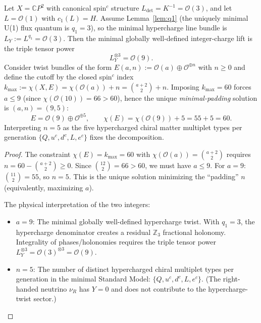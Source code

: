 \begin{lemma}\label{lem:E_bundle_kmax60}
Let $X=\mathbb{C}P^2$ with canonical spin$^c$ structure $L_{\det}=K^{-1}=\mathcal{O}(3)$, and let $L=\mathcal{O}(1)$ with $c_1(L)=H$.
Assume Lemma~\ref{lem:q1} (the uniquely minimal U(1) flux quantum is $q_1=3$), so the minimal hypercharge line bundle is $L_Y:=L^{q_1}=\mathcal{O}(3)$.
Then the minimal globally well-defined integer-charge lift is the triple tensor power
\[
L_Y^{\otimes 3}=\mathcal{O}(9).
\]
Consider twist bundles of the form $E(a,n):=\mathcal{O}(a)\oplus \mathcal{O}^{\oplus n}$ with $n\ge 0$ and define the cutoff by the closed spin$^c$ index
$k_{\max}:=\chi(X,E)=\chi(\mathcal{O}(a))+n=\binom{a+2}{2}+n$.
Imposing $k_{\max}=60$ forces $a\le 9$ (since $\chi(\mathcal{O}(10))=66>60$), hence the unique \emph{minimal-padding} solution is $(a,n)=(9,5)$:
\[
E=\mathcal{O}(9)\oplus \mathcal{O}^{\oplus 5},\qquad \chi(E)=\chi(\mathcal{O}(9))+5=55+5=60.
\]
Interpreting $n=5$ as the five hypercharged chiral matter multiplet types per generation $\{Q,u^c,d^c,L,e^c\}$ fixes the decomposition.
\end{lemma}

\begin{proof}
The constraint $\chi(E) = k_{\max} = 60$ with $\chi(\mathcal{O}(a)) = \binom{a+2}{2}$ requires $n = 60 - \binom{a+2}{2} \geq 0$. Since $\binom{12}{2} = 66 > 60$, we must have $a \leq 9$. For $a = 9$: $\binom{11}{2} = 55$, so $n = 5$. This is the unique solution minimizing the ``padding'' $n$ (equivalently, maximizing $a$).

The physical interpretation of the two integers:
\begin{itemize}
\item $a = 9$: The minimal globally well-defined hypercharge twist. With $q_1 = 3$, the hypercharge denominator creates a residual $\mathbb{Z}_3$ fractional holonomy. Integrality of phases/holonomies requires the triple tensor power $L_Y^{\otimes 3} = \mathcal{O}(3)^{\otimes 3} = \mathcal{O}(9)$.
\item $n = 5$: The number of distinct hypercharged chiral multiplet types per generation in the minimal Standard Model: $\{Q, u^c, d^c, L, e^c\}$. (The right-handed neutrino $\nu_R$ has $Y = 0$ and does not contribute to the hypercharge-twist sector.)
\end{itemize}
\end{proof}


